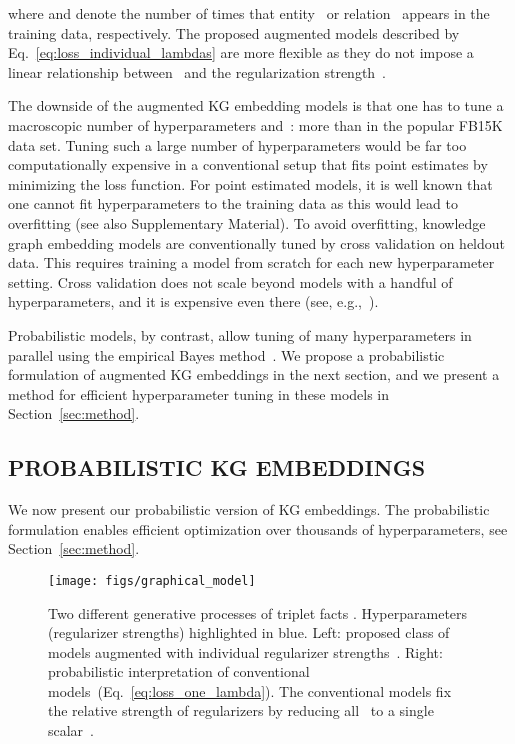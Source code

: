 \documentclass[letterpage]{article}
\begin{document}
where  and  denote the number of times that entity~ or relation~ appears in the training data, respectively.
The proposed augmented models described by Eq.~\ref{eq:loss_individual_lambdas} are more flexible as they do not impose a linear relationship between~ and the regularization strength~.

The downside of the augmented KG embedding models is that one has to tune a macroscopic number of hyperparameters  and~:
more than  in the popular FB15K data set.
Tuning such a large number of hyperparameters would be far too computationally expensive in a conventional setup that fits point estimates by minimizing the loss function.
For point estimated models, it is well known that one cannot fit hyperparameters to the training data as this would lead to overfitting (see also Supplementary Material).
To avoid overfitting, knowledge graph embedding models are conventionally tuned by cross validation on heldout data.
This requires training a model from scratch for each new hyperparameter setting.
Cross validation does not scale beyond models with a handful of hyperparameters, and it is expensive even there (see, e.g.,~\citep{KBK2017,LUO2018}).

Probabilistic models, by contrast, allow tuning of many hyperparameters in parallel using the empirical Bayes method~\citep{dempster1977maximum,maritz2018empirical}.
We propose a probabilistic formulation of augmented KG embeddings in the next section, and we present a method for efficient hyperparameter tuning in these models in Section~\ref{sec:method}.


\subsection{PROBABILISTIC KG EMBEDDINGS}
\label{sec:probabilistic_models}


We now present our probabilistic version of KG embeddings.
The probabilistic formulation enables efficient optimization over thousands of hyperparameters, see Section~\ref{sec:method}.


\begin{figure}
  \centering
  \texttt{[image: figs/graphical\_model]}
  \caption{Two different generative processes of triplet facts .
  Hyperparameters (regularizer strengths) highlighted in blue.
  Left: proposed class of models augmented with individual regularizer strengths~.
  Right: probabilistic interpretation of conventional models~(Eq.~\ref{eq:loss_one_lambda}).
  The conventional models fix the relative strength of regularizers by reducing all~ to a single scalar~.}\label{fig:generative}
\end{figure}
\end{document}
